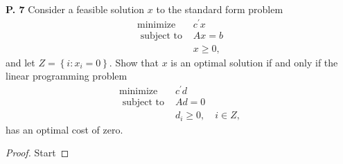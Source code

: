 \documentclass{article}
\begin{document}
\begin{jacklist}
\newpage
    \begin{framed} 
    \item [\textbf{P. 7}] Consider a feasible solution $x$ to the standard form problem 
        \begin{align*}
            \text{minimize } & c^{\prime} x \\
            \text { subject to } & A x=b \\
            & x \geq 0,
        \end{align*}
        and let $Z=\left\{i: x_{i}=0\right\}$. Show that $x$ is an optimal solution if and only if the linear programming problem
        \begin{align*}
            \text{minimize } & c^{\prime} d \\
            \text { subject to } & A d=0 \quad \\
            & d_{i} \geq 0, \quad i \in Z,
        \end{align*}
        has an optimal cost of zero.
    \end{framed}
    \begin{proof}
        Start
    \end{proof}


\end{jacklist}
\end{document}
